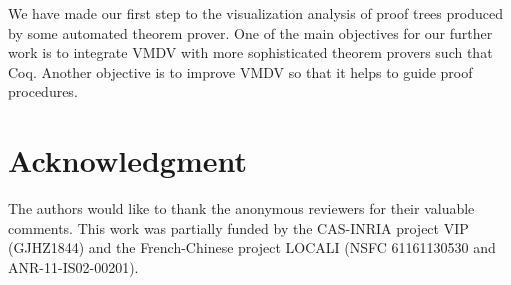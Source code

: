\documentclass[runningheads]{llncs}
\newcommand\tool[1]{\textsf{#1}}
\newcommand\vmdv{\tool{VMDV}}
\begin{document}
We have made our first step to the visualization analysis of proof trees produced by some automated theorem prover.
One of the main objectives for our further work is to integrate \vmdv{} with more sophisticated theorem provers such that \textsf{Coq}.
Another objective is to improve \vmdv{} so that it helps to guide proof procedures.

\section*{Acknowledgment}
The authors would like to thank the anonymous reviewers for their valuable comments.
This work was partially funded by the CAS-INRIA project VIP (GJHZ1844) and the French-Chinese project LOCALI (NSFC 61161130530 and ANR-11-IS02-00201).






\end{document}
